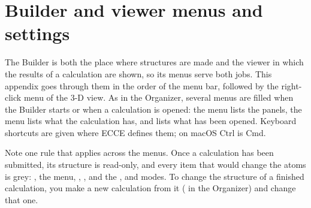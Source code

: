 \chapter{Builder and viewer menus and settings}
\label{ch:menus-builder}


The Builder is both the place where structures are made and the viewer in which the results of a calculation are shown, so its menus serve both jobs. This appendix goes through them in the order of the menu bar, followed by the right-click menu of the 3-D view. As in the Organizer, several menus are filled when the Builder starts or when a calculation is opened: the  menu lists the panels, the  menu lists what the calculation has, and  lists what has been opened. Keyboard shortcuts are given where ECCE defines them; on macOS \textsf{Ctrl} is \textsf{Cmd}.

Note one rule that applies across the menus. Once a calculation has been submitted, its structure is read-only, and every item that would change the atoms is grey: , the  menu, , ,  and the ,  and  modes. To change the structure of a finished calculation, you make a new calculation from it ( in the Organizer) and change that one.

